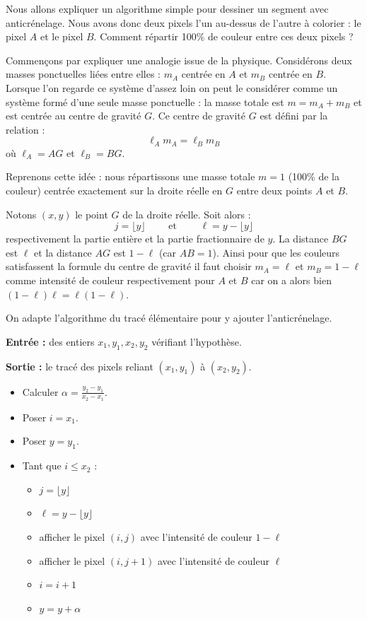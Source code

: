 \documentclass[11pt,class=report,crop=false]{standalone}
\begin{document}
Nous allons expliquer un algorithme simple pour dessiner un segment avec anticrénelage. 
Nous avons donc deux pixels l'un au-dessus de l'autre à colorier : le pixel $A$ et le pixel $B$.
Comment répartir 100\% de couleur  entre ces deux pixels ?

Commençons par expliquer une analogie issue de la physique.
Considérons deux masses ponctuelles liées entre elles : $m_A$ centrée en $A$ et $m_B$ centrée en $B$. Lorsque l'on regarde ce système d'assez loin on peut le considérer comme un système formé d'une seule masse ponctuelle : la masse totale est $m=m_A+m_B$ et est centrée au centre de gravité $G$. Ce centre de gravité $G$ est défini par la relation :
$$\ell_A m_A = \ell_B m_B$$
où $\ell_A = AG$ et $\ell_B = BG$.



Reprenons cette idée : nous répartissons une masse totale $m=1$ (100\% de la couleur) centrée exactement sur la droite réelle en $G$ entre deux points $A$ et $B$.

Notons $(x,y)$ le point $G$ de la droite réelle. Soit alors :
$$j = \lfloor y \rfloor \qquad \text{ et } \qquad \ell = y - \lfloor y \rfloor$$
respectivement la partie entière et la partie fractionnaire de $y$.
La distance $BG$ est $\ell$ et la distance $AG$ est $1-\ell$ (car $AB = 1$).
Ainsi pour que les couleurs satisfassent la formule du centre de gravité il faut choisir 
$m_A = \ell$ et $m_B = 1-\ell$ comme intensité de couleur respectivement pour $A$ et $B$ car on a alors bien
$(1-\ell) \ell = \ell (1-\ell)$.

On adapte l'algorithme du tracé élémentaire pour y ajouter l'anticrénelage.

\begin{algorithme}

\textbf{Entrée :} des entiers $x_1, y_1, x_2, y_2$ vérifiant l'hypothèse.

\textbf{Sortie :} le tracé des pixels reliant $(x_1,y_1)$ à $(x_2,y_2)$.

\begin{itemize}
	\item Calculer $\alpha =  \frac{y_2-y_1}{x_2-x_1}$.
	\item Poser $i = x_1$.
	\item Poser $y = y_1$.
	
	\item Tant que $i \le x_2$ :
	\begin{itemize}
		\item $j = \lfloor y \rfloor$
		\item $\ell = y - \lfloor y \rfloor$
		\item afficher le pixel $(i,j)$ avec l'intensité de couleur $1-\ell$
		\item afficher le pixel $(i,j+1)$ avec l'intensité de couleur $\ell$		
		\item $i = i + 1$
		\item $y = y + \alpha$
	\end{itemize}
\end{itemize}
\end{algorithme}
\end{document}

